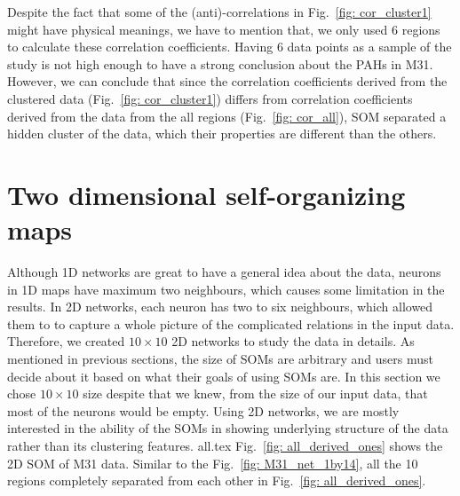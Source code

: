        Despite the fact that some of the (anti)-correlations in Fig.~\ref{fig: cor_cluster1} might have physical meanings, we have to mention that, we only used 6 regions to calculate these correlation coefficients.
       Having 6 data points as a sample of the study is not high enough to have a strong conclusion about the PAHs in M31.%
        However, we can conclude that since the correlation coefficients derived from the clustered data (Fig.~\ref{fig: cor_cluster1}) differs from correlation coefficients derived from the data from the all regions (Fig.~\ref{fig: cor_all}), SOM separated a hidden cluster of the data, which their properties are different than the others. %
        
        
        
        
        

 \section{Two dimensional self-organizing maps}
 \label{sec: 2d_cluster}
    Although 1D networks are great to have a general idea about the data, neurons in 1D maps have maximum two neighbours, which causes some limitation in the results.
    In 2D networks, each neuron has two to six neighbours, which allowed them to to capture a whole picture of the complicated relations in the input data.
    Therefore, we created $10\times10$ 2D networks to study the data in details.
    As mentioned in previous sections, the size of SOMs are arbitrary and users must decide about it based on what their goals of using SOMs are.
    In this section we chose $10\times10$ size despite that we knew, from the size of our input data, that most of the neurons would be empty.
    Using 2D networks, we are mostly interested in the ability of the SOMs in showing underlying structure of the data rather than its clustering features.
    {all.tex}
    Fig.~\ref{fig: all_derived_ones} shows the 2D SOM of M31 data.
    Similar to the Fig.~\ref{fig: M31_net_1by14}, all the 10 regions completely separated from each other in Fig.~\ref{fig: all_derived_ones}.
    
